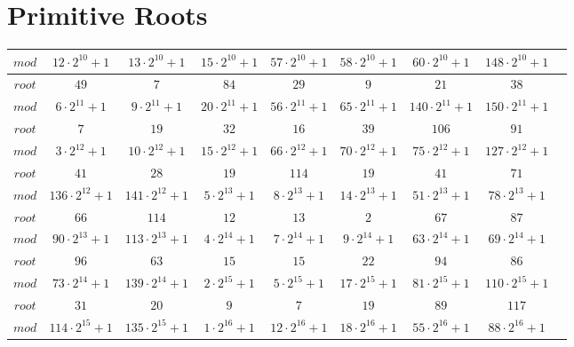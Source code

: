 \documentclass{article}
\begin{document}
\section*{Primitive Roots}

\begin{tabular}{|c|c|c|c|c|c|c|c|c|}
\hline
\hline
$mod$& $12\cdot 2^{10}+1$& $13\cdot 2^{10}+1$& $15\cdot 2^{10}+1$& $57\cdot 2^{10}+1$& $58\cdot 2^{10}+1$& $60\cdot 2^{10}+1$& $148\cdot 2^{10}+1$\\
\hline

$root$& $49$& $7$& $84$& $29$& $9$& $21$& $38$\\
\hline


$mod$& $6\cdot 2^{11}+1$& $9\cdot 2^{11}+1$& $20\cdot 2^{11}+1$& $56\cdot 2^{11}+1$& $65\cdot 2^{11}+1$& $140\cdot 2^{11}+1$& $150\cdot 2^{11}+1$\\
\hline

$root$& $7$& $19$& $32$& $16$& $39$& $106$& $91$\\
\hline


$mod$& $3\cdot 2^{12}+1$& $10\cdot 2^{12}+1$& $15\cdot 2^{12}+1$& $66\cdot 2^{12}+1$& $70\cdot 2^{12}+1$& $75\cdot 2^{12}+1$& $127\cdot 2^{12}+1$\\
\hline

$root$& $41$& $28$& $19$& $114$& $19$& $41$& $71$\\
\hline

$mod$& $136\cdot 2^{12}+1$& $141\cdot 2^{12}+1$& $5\cdot 2^{13}+1$& $8\cdot 2^{13}+1$& $14\cdot 2^{13}+1$& $51\cdot 2^{13}+1$& $78\cdot 2^{13}+1$\\
\hline

$root$& $66$& $114$& $12$& $13$& $2$& $67$& $87$\\
\hline


$mod$& $90\cdot 2^{13}+1$& $113\cdot 2^{13}+1$& $4\cdot 2^{14}+1$& $7\cdot 2^{14}+1$& $9\cdot 2^{14}+1$& $63\cdot 2^{14}+1$& $69\cdot 2^{14}+1$\\
\hline

$root$& $96$& $63$& $15$& $15$& $22$& $94$& $86$\\
\hline


$mod$& $73\cdot 2^{14}+1$& $139\cdot 2^{14}+1$& $2\cdot 2^{15}+1$& $5\cdot 2^{15}+1$& $17\cdot 2^{15}+1$& $81\cdot 2^{15}+1$& $110\cdot 2^{15}+1$\\
\hline

$root$& $31$& $20$& $9$& $7$& $19$& $89$& $117$\\
\hline


$mod$& $114\cdot 2^{15}+1$& $135\cdot 2^{15}+1$& $1\cdot 2^{16}+1$& $12\cdot 2^{16}+1$& $18\cdot 2^{16}+1$& $55\cdot 2^{16}+1$& $88\cdot 2^{16}+1$\\
\hline


\end{tabular}
\end{document}
